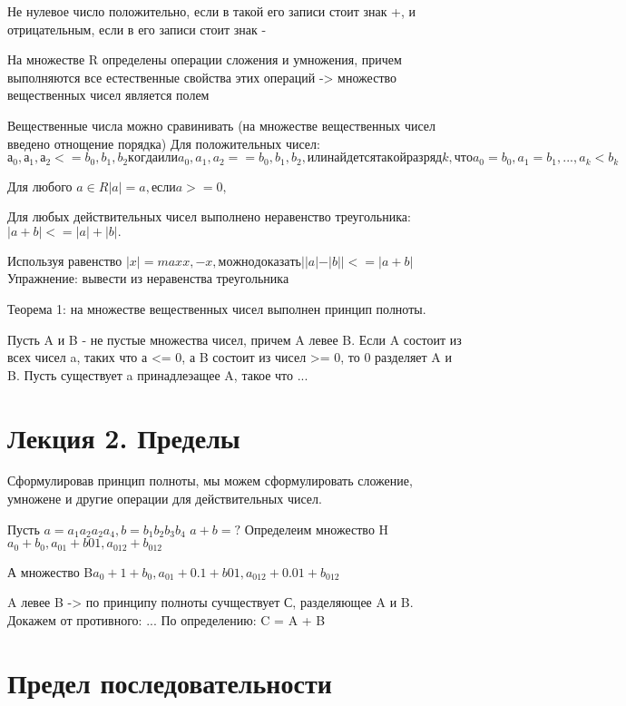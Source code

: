 \documentclass[a4paper]{article}
\begin{document}
Не нулевое число положительно, если в такой его записи стоит знак +, и отрицательным, если в его записи стоит знак -

На множестве R определены операции сложения и умножения, причем выполняются все естественные свойства этих операций -> множество вещественных чисел является полем

Вещественные числа можно сравинивать (на множестве вещественных чисел введено отнощение порядка)
Для положительных чисел: $а_0, а_1, а_2 <=  b_0, b_1, b_2 когда или a_0, a_1, a_2 == b_0, b_1, b_2, или найдется такой разряд k, что a_0 = b_0, a_1 = b_1, ..., a_k < b_k$


Для любого $a \in R  |a| = a, если a>=0,$ 


Для любых действительных чисел выполнено неравенство треугольника: $|a + b| <= |a| + |b|.$

Используя равенство $|x| = max{x, -x}, можно доказать ||a| - |b|| <=|a+b|$
Упражнение: вывести из неравенства треугольника 




Теорема 1: на множестве вещественных чисел выполнен принцип полноты.

Пусть A  и B - не пустые множества чисел, причем A левее B. Если A состоит из всех чисел a, таких что а <= 0, а B состоит из чисел >= 0, то 0 разделяет A и B.
Пусть существует a принадлеэащее A, такое что ...


\section*{Лекция 2. Пределы}

Сформулировав принцип полноты, мы можем сформулировать сложение, умножене и другие операции для действительных чисел.

Пусть $a = a_1 a_2 a_2a_4, b=b_1b_2b_3b_4$
$a+b = ?$
Определеим множество H${a_0 + b_0, a_{01} + b{01}, a_{012} + b_{012}}$

А множество B${a_0 + 1 + b_0, a_{01} + 0.1+ b{01}, a_{012} + 0.01 + b_{012}}$

A левее B -> по принципу полноты сучществует С, разделяющее A и B.
Докажем от противного:  ...
По определению: C = A + B

\section*{Предел последовательности}
\end{document}
